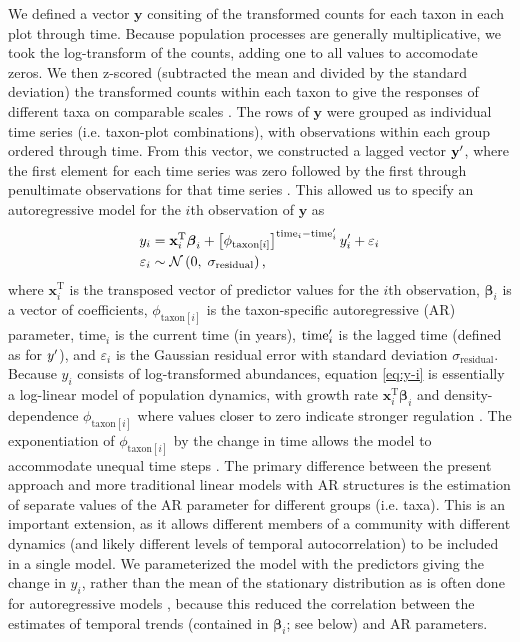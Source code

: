We defined a vector $\mathbf{y}$ consiting of the transformed counts
for each taxon in each plot through time.
Because population processes are generally multiplicative,
we took the log-transform of the counts,
adding one to all values to accomodate zeros.
We then z-scored (subtracted the mean and divided by the standard deviation)
the transformed counts within each taxon
to give the responses of different taxa on comparable scales \citep{Jackson2012}.
The rows of $\mathbf{y}$ were grouped as individual time series
(i.e. taxon-plot combinations),
with observations within each group ordered through time.
From this vector,
we constructed a lagged vector $\mathbf{y\sp{\prime}}$,
where the first element for each time series was zero
followed by the first through
penultimate observations for that time series \citep{Ives2006}.
This allowed us to specify an autoregressive model for the $i$th observation of
$\mathbf{y}$ as
%
\begin{equation} \label{eq:y-i}
\begin{split}
    y_i &= \mathbf{x}_i^\text{T} {\boldsymbol\beta}_i +
        \left[ \phi_{\text{taxon}[i]} \right]^{\text{time}_i - \text{time}\sp{\prime}_i}
        y\sp{\prime}_i + \varepsilon_i \\
    \varepsilon_i &\sim \mathcal{N} \left(0, \; \sigma_{\text{residual}} \right)
    \text{,}
\end{split}
\end{equation}
%
\noindent where $\mathbf{x}_i^\text{T}$ is the transposed vector
of predictor values for the $i$th observation,
${\boldsymbol\beta}_i$ is a vector of coefficients,
$\phi_{\text{taxon}[i]}$ is the taxon-specific autoregressive (AR) parameter,
$\text{time}_i$ is the current time (in years),
$\text{time}\sp{\prime}_i$ is the lagged time (defined as for  $y\sp{\prime}$),
and $\varepsilon_i$  is the Gaussian residual
error with standard deviation $\sigma_{\text{residual}}$.
Because $y_i$ consists of log-transformed abundances, equation \ref{eq:y-i} is
essentially a log-linear model of population dynamics, with growth rate
$\mathbf{x}_i^\text{T} {\boldsymbol\beta}_i$ and
density-dependence $\phi_{\text{taxon}[i]}$
where values closer to zero indicate stronger regulation \citep{Ives2010}.
The exponentiation of $\phi_{\text{taxon}[i]}$ by the change in time allows the model
to accommodate unequal time steps \citep{Zuur2009}.
The primary difference between the present approach and more traditional linear models
with AR structures \citep[e.g., ][]{Zuur2009} is the estimation of separate values of the AR
parameter for different groups (i.e. taxa).
This is an important extension, as it allows different members of a community with
different dynamics (and likely different levels of temporal autocorrelation)
to be included in a single model.
We parameterized the model with the predictors giving the change in $y_i$,
rather than the mean of the stationary distribution as is often done
for autoregressive models \citep{Harvey1990, Ives2006},
because this reduced the correlation between the estimates of temporal trends
(contained in ${\boldsymbol\beta}_i$; see below) and AR parameters.

